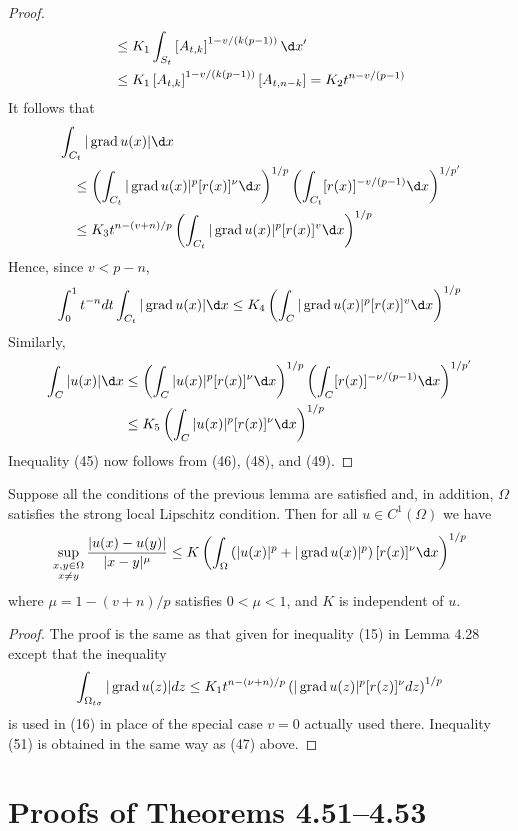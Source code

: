\begin{proof}
\[\begin{aligned}
  & \leq K_1 \int_{S_t}\left[A_{t, k}\right]^{1-v /(k(p-1))} \d x^{\prime} \\
  & \leq K_1\left[A_{t, k}\right]^{1-v /(k(p-1))}\left[A_{t, n-k}\right]=K_2 t^{n-v /(p-1)}
  \end{aligned}
  \]
  It follows that
  \[
  \begin{aligned}
  & \int_{C_t}|\grad u(x)| \d x \\
  & \quad \leq\left(\int_{C_t}|\grad u(x)|^p[r(x)]^\nu \d x\right)^{1 / p}\left(\int_{C_t}[r(x)]^{-v /(p-1)} \d x\right)^{1 / p^{\prime}} \\
  & \quad \leq K_3 t^{n-(v+n) / p}\left(\int_{C_t}|\grad u(x)|^p[r(x)]^v \d x\right)^{1 / p}
  \end{aligned}
  \]
  Hence, since $v<p-n$,
  \[
  \int_0^1 t^{-n} d t \int_{C_t}|\grad u(x)| \d x \leq K_4\left(\int_C|\grad u(x)|^p[r(x)]^v \d x\right)^{1 / p}
  \]
  Similarly,
  \[
  \begin{aligned}
  \int_C|u(x)| \d x & \leq\left(\int_C|u(x)|^p[r(x)]^\nu \d x\right)^{1 / p}\left(\int_C[r(x)]^{-\nu /(p-1)} \d x\right)^{1 / p^{\prime}} \\
  & \leq K_5\left(\int_C|u(x)|^p[r(x)]^\nu \d x\right)^{1 / p}
  \end{aligned}
  \]
  Inequality (45) now follows from (46), (48), and (49).
\end{proof}


\begin{lemma}
  Suppose all the conditions of the previous lemma are satisfied and, in addition, $\Omega$ satisfies the strong local Lipschitz condition. Then for all $u \in C^1(\Omega)$ we have
  \[
  \sup _{\substack{x, y \in \Omega \\ x \neq y}} \frac{|u(x)-u(y)|}{|x-y|^\mu} \leq K\left(\int_{\Omega}\left(|u(x)|^p+|\grad u(x)|^p\right)[r(x)]^\nu \d x\right)^{1 / p}
  \]
  where $\mu=1-(v+n) / p$ satisfies $0<\mu<1$, and $K$ is independent of $u$.
\end{lemma}

\begin{proof}
  The proof is the same as that given for inequality (15) in Lemma 4.28 except that the inequality
  \[
  \int_{\Omega_{t \sigma}}|\operatorname{grad} u(z)| d z \leq K_1 t^{n-(\nu+n) / p}\left(|\operatorname{grad} u(z)|^p[r(z)]^\nu d z\right)^{1 / p}
  \]
  is used in (16) in place of the special case $v=0$ actually used there. Inequality (51) is obtained in the same way as (47) above.
\end{proof}


\section{Proofs of Theorems 4.51--4.53}


